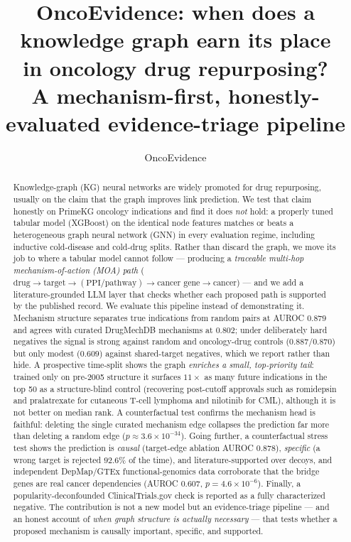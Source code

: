 \documentclass[11pt]{article}
\title{\textbf{OncoEvidence: when does a knowledge graph earn its place\\
in oncology drug repurposing?}\\[2pt]
\large A mechanism-first, honestly-evaluated evidence-triage pipeline}
\author{OncoEvidence}
\affil{\small Research preprint --- hypothesis-generating, not medical advice}
\date{}
\begin{document}
\maketitle

\begin{abstract}
\noindent
Knowledge-graph (KG) neural networks are widely promoted for drug repurposing, usually on
the claim that the graph improves link prediction. We test that claim honestly on PrimeKG
oncology indications and find it does \emph{not} hold: a properly tuned tabular model
(XGBoost) on the identical node features matches or beats a heterogeneous graph neural
network (GNN) in every evaluation regime, including inductive cold-disease and cold-drug
splits. Rather than discard the graph, we move its job to where a tabular model cannot
follow --- producing a \emph{traceable multi-hop mechanism-of-action (MOA) path}
($\text{drug}\rightarrow\text{target}\rightarrow(\text{PPI}/\text{pathway})\rightarrow\text{cancer
gene}\rightarrow\text{cancer}$) --- and we add a literature-grounded LLM layer that checks
whether each proposed path is supported by the published record. We evaluate this pipeline
instead of demonstrating it. Mechanism structure separates true indications from random
pairs at AUROC $0.879$ and agrees with curated DrugMechDB mechanisms at $0.802$; under
deliberately hard negatives the signal is strong against random and oncology-drug controls
($0.887$/$0.870$) but only modest ($0.609$) against shared-target negatives, which we report
rather than hide. A prospective time-split shows the graph \emph{enriches a small,
top-priority tail}: trained only on pre-2005 structure it surfaces $11\times$ as many
future indications in the top 50 as a structure-blind control (recovering post-cutoff
approvals such as romidepsin and pralatrexate for cutaneous T-cell lymphoma and nilotinib
for CML), although it is not better on median rank. A counterfactual test confirms the
mechanism head is faithful: deleting the single curated mechanism edge collapses the
prediction far more than deleting a random edge ($p\approx3.6\times10^{-34}$). Going further,
a counterfactual stress test shows the prediction is \emph{causal} (target-edge ablation
AUROC $0.878$), \emph{specific} (a wrong target is rejected $92.6\%$ of the time), and
literature-supported over decoys, and independent DepMap/GTEx functional-genomics data
corroborate that the bridge genes are real cancer dependencies (AUROC $0.607$,
$p=4.6\times10^{-6}$). Finally, a popularity-deconfounded ClinicalTrials.gov check is reported
as a fully characterized negative. The contribution is not a new model but an evidence-triage
pipeline --- and an honest account of \emph{when graph structure is actually necessary} ---
that tests whether a proposed mechanism is causally important, specific, and supported.
\end{abstract}
\end{document}
